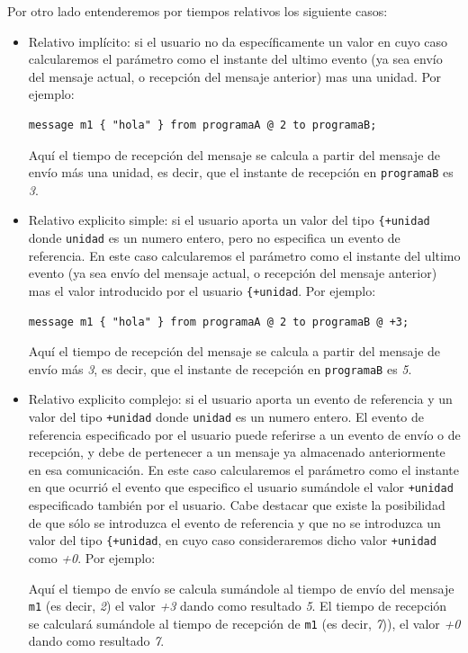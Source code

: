 \documentclass[12pt,a4paper]{report}
\begin{document}
Por otro lado entenderemos por tiempos relativos los siguiente casos:

\begin{itemize}
\item Relativo implícito: si el usuario no da específicamente un valor en cuyo caso calcularemos el parámetro como el instante del ultimo evento (ya sea envío del mensaje actual, o recepción del mensaje anterior) mas una unidad. Por ejemplo:
\begin{lstlisting}
message m1 { "hola" } from programaA @ 2 to programaB;
\end{lstlisting}
Aquí el tiempo de recepción del mensaje se calcula a partir del mensaje de envío más una unidad, es decir, que el instante de recepción en \lstinline{programaB} es \textit{3}.
\item Relativo explicito simple: si el usuario aporta un valor del tipo \lstinline{{+unidad} donde \lstinline{unidad} es un numero entero, pero no especifica un evento de referencia. En este caso calcularemos el parámetro como el instante del ultimo evento (ya sea envío del mensaje actual, o recepción del mensaje anterior) mas el valor introducido por el usuario \lstinline{{+unidad}. Por ejemplo:

\begin{lstlisting}
message m1 { "hola" } from programaA @ 2 to programaB @ +3;
\end{lstlisting}

Aquí el tiempo de recepción del mensaje se calcula a partir del mensaje de envío más \textit{3}, es decir, que el instante de recepción en \lstinline{programaB} es \textit{5}.

\item Relativo explicito complejo: si el usuario aporta un evento de referencia y un valor del tipo \lstinline{+unidad} donde \lstinline{unidad} es un numero entero. El evento de referencia especificado por el usuario puede referirse a un evento de envío o de recepción, y debe de pertenecer a un mensaje ya almacenado anteriormente en esa comunicación. En este caso calcularemos el parámetro como el instante en que ocurrió el evento que especifico el usuario sumándole el valor \lstinline{+unidad} especificado también por el usuario. Cabe destacar que existe la posibilidad de que sólo se introduzca el evento de referencia y que no se introduzca un valor del tipo \lstinline{{+unidad}, en cuyo caso consideraremos dicho valor \lstinline{+unidad} como \textit{+0}. Por ejemplo:


Aquí el tiempo de envío se calcula sumándole al tiempo de envío del mensaje \lstinline{m1} (es decir, \textit{2}) el valor \textit{+3} dando como resultado \textit{5}. El tiempo de recepción se calculará sumándole al tiempo de recepción de \lstinline{m1} (es decir, \textit{7})), el valor \textit{+0} dando como resultado \textit{7}.
\end{itemize}
\end{document}

